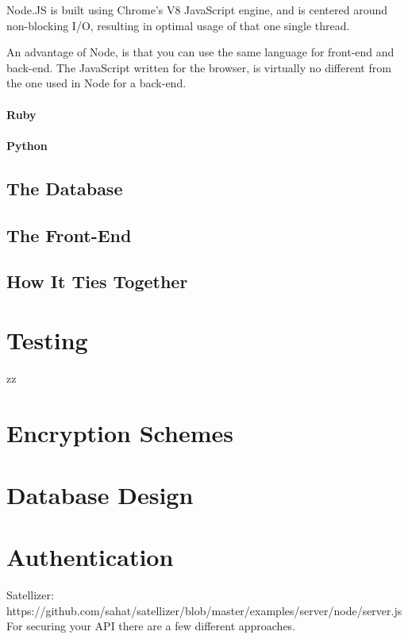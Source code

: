 					Node.JS is built using Chrome's V8 JavaScript engine, and is centered around non-blocking I/O, resulting in optimal usage of that one single thread.

					An advantage of Node, is that you can use the same language for front-end and back-end. The JavaScript written for the browser, is virtually no different from the one used in Node for a back-end. 
				\paragraph{Ruby}
				\paragraph{Python}


		\subsection{The Database}

		\subsection{The Front-End}

		\subsection{How It Ties Together}

	\section{Testing}
	zz

	\section{Encryption Schemes}
	\section{Database Design}

	\section{Authentication}
		Satellizer: https://github.com/sahat/satellizer/blob/master/examples/server/node/server.js\\

		For securing your API there are a few different approaches.

